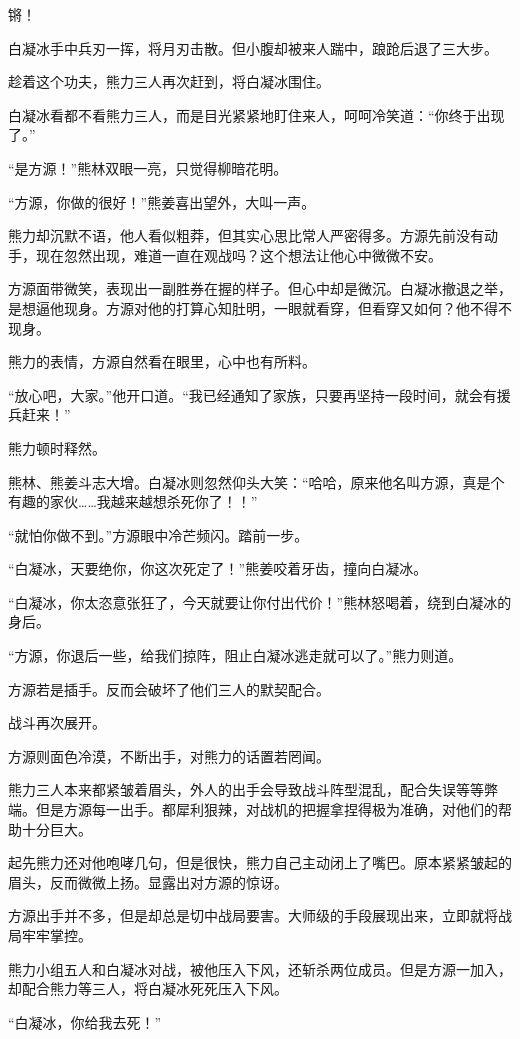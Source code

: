 \begin{this_body}
锵！

白凝冰手中兵刃一挥，将月刃击散。但小腹却被来人踹中，踉跄后退了三大步。

趁着这个功夫，熊力三人再次赶到，将白凝冰围住。

白凝冰看都不看熊力三人，而是目光紧紧地盯住来人，呵呵冷笑道：“你终于出现了。”

“是方源！”熊林双眼一亮，只觉得柳暗花明。

“方源，你做的很好！”熊姜喜出望外，大叫一声。

熊力却沉默不语，他人看似粗莽，但其实心思比常人严密得多。方源先前没有动手，现在忽然出现，难道一直在观战吗？这个想法让他心中微微不安。

方源面带微笑，表现出一副胜券在握的样子。但心中却是微沉。白凝冰撤退之举，是想逼他现身。方源对他的打算心知肚明，一眼就看穿，但看穿又如何？他不得不现身。

熊力的表情，方源自然看在眼里，心中也有所料。

“放心吧，大家。”他开口道。“我已经通知了家族，只要再坚持一段时间，就会有援兵赶来！”

熊力顿时释然。

熊林、熊姜斗志大增。白凝冰则忽然仰头大笑：“哈哈，原来他名叫方源，真是个有趣的家伙……我越来越想杀死你了！！”

“就怕你做不到。”方源眼中冷芒频闪。踏前一步。

“白凝冰，天要绝你，你这次死定了！”熊姜咬着牙齿，撞向白凝冰。

“白凝冰，你太恣意张狂了，今天就要让你付出代价！”熊林怒喝着，绕到白凝冰的身后。

“方源，你退后一些，给我们掠阵，阻止白凝冰逃走就可以了。”熊力则道。

方源若是插手。反而会破坏了他们三人的默契配合。

战斗再次展开。

方源则面色冷漠，不断出手，对熊力的话置若罔闻。

熊力三人本来都紧皱着眉头，外人的出手会导致战斗阵型混乱，配合失误等等弊端。但是方源每一出手。都犀利狠辣，对战机的把握拿捏得极为准确，对他们的帮助十分巨大。

起先熊力还对他咆哮几句，但是很快，熊力自己主动闭上了嘴巴。原本紧紧皱起的眉头，反而微微上扬。显露出对方源的惊讶。

方源出手并不多，但是却总是切中战局要害。大师级的手段展现出来，立即就将战局牢牢掌控。

熊力小组五人和白凝冰对战，被他压入下风，还斩杀两位成员。但是方源一加入，却配合熊力等三人，将白凝冰死死压入下风。

“白凝冰，你给我去死！”


\end{this_body}
